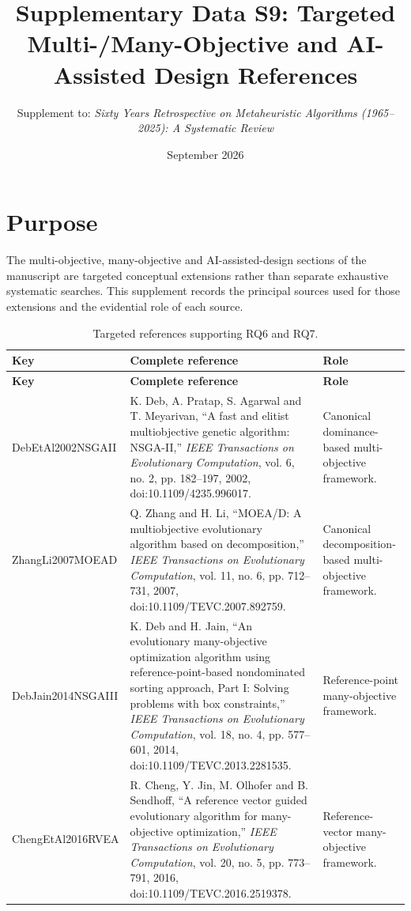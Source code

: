 \documentclass[9pt]{article}
\title{Supplementary Data S9: Targeted Multi-/Many-Objective and AI-Assisted Design References}
\author{Supplement to: \textit{Sixty Years Retrospective on Metaheuristic Algorithms (1965--2025): A Systematic Review}}
\date{September 2026}
\begin{document}
\maketitle

\section*{Purpose}
The multi-objective, many-objective and AI-assisted-design sections of the manuscript are targeted conceptual extensions rather than separate exhaustive systematic searches. This supplement records the principal sources used for those extensions and the evidential role of each source.

\small
\begin{longtable}{P{3.1cm}P{8.5cm}P{3.2cm}}
\caption{Targeted references supporting RQ6 and RQ7.}\\
\toprule
\textbf{Key} & \textbf{Complete reference} & \textbf{Role}\\
\midrule
\endfirsthead
\toprule
\textbf{Key} & \textbf{Complete reference} & \textbf{Role}\\
\midrule
\endhead
DebEtAl2002NSGAII & K. Deb, A. Pratap, S. Agarwal and T. Meyarivan, ``A fast and elitist multiobjective genetic algorithm: NSGA-II,'' \textit{IEEE Transactions on Evolutionary Computation}, vol. 6, no. 2, pp. 182--197, 2002, doi:10.1109/4235.996017. & Canonical dominance-based multi-objective framework.\\
ZhangLi2007MOEAD & Q. Zhang and H. Li, ``MOEA/D: A multiobjective evolutionary algorithm based on decomposition,'' \textit{IEEE Transactions on Evolutionary Computation}, vol. 11, no. 6, pp. 712--731, 2007, doi:10.1109/TEVC.2007.892759. & Canonical decomposition-based multi-objective framework.\\
DebJain2014NSGAIII & K. Deb and H. Jain, ``An evolutionary many-objective optimization algorithm using reference-point-based nondominated sorting approach, Part I: Solving problems with box constraints,'' \textit{IEEE Transactions on Evolutionary Computation}, vol. 18, no. 4, pp. 577--601, 2014, doi:10.1109/TEVC.2013.2281535. & Reference-point many-objective framework.\\
ChengEtAl2016RVEA & R. Cheng, Y. Jin, M. Olhofer and B. Sendhoff, ``A reference vector guided evolutionary algorithm for many-objective optimization,'' \textit{IEEE Transactions on Evolutionary Computation}, vol. 20, no. 5, pp. 773--791, 2016, doi:10.1109/TEVC.2016.2519378. & Reference-vector many-objective framework.\\

\end{longtable}
\end{document}
